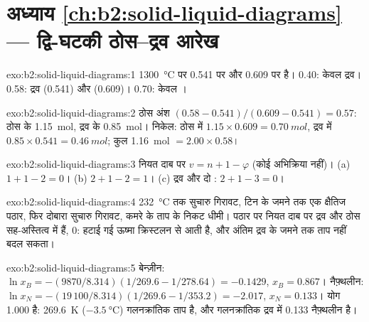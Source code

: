 \section*{अध्याय \ref{ch:b2:solid-liquid-diagrams} --- द्वि-घटकी ठोस--द्रव आरेख}

\begin{solution}{exo:b2:solid-liquid-diagrams:1}
\qty{1300}{\degreeCelsius} पर  0.541 पर और  0.609 पर है।
0.40: केवल द्रव। 0.58: द्रव (0.541) और  (0.609)। 0.70:
केवल ।
\end{solution}

\begin{solution}{exo:b2:solid-liquid-diagrams:2}
ठोस अंश $(0.58 - 0.541)/(0.609 - 0.541) = 0.57$: ठोस के \qty{1.15}{mol},
द्रव के \qty{0.85}{mol}। निकेल: ठोस में $1.15 \times 0.609 = \qty{0.70}{mol}$,
द्रव में $0.85 \times 0.541 = \qty{0.46}{mol}$; कुल \qty{1.16}{mol}
$= 2.00 \times 0.58$।
\end{solution}

\begin{solution}{exo:b2:solid-liquid-diagrams:3}
नियत दाब पर $v = n + 1 - \varphi$ (कोई अभिक्रिया नहीं)। (a) $1 + 1 - 2 = 0$।
(b) $2 + 1 - 2 = 1$। (c) द्रव और दो : $2 + 1 - 3 = 0$।
\end{solution}

\begin{solution}{exo:b2:solid-liquid-diagrams:4}
\qty{232}{\degreeCelsius} तक सुचारु गिरावट, टिन के जमने तक एक क्षैतिज पठार,
फिर दोबारा सुचारु गिरावट, कमरे के ताप के निकट धीमी। पठार पर
नियत दाब पर द्रव और ठोस सह-अस्तित्व में हैं,  0: हटाई गई ऊष्मा
क्रिस्टलन से आती है, और अंतिम द्रव के जमने तक ताप नहीं बदल
सकता।
\end{solution}

\begin{solution}{exo:b2:solid-liquid-diagrams:5}
बेन्ज़ीन: $\ln x_B = -(9870/8.314)(1/269.6 - 1/278.64) = -0.1429$, $x_B =
0.867$। नैफ़्थलीन: $\ln x_N = -(19\,100/8.314)(1/269.6 - 1/353.2) = -2.017$,
$x_N = 0.133$। योग 1.000 है: \qty{269.6}{K} ($\qty{-3.5}{\degreeCelsius}$)
गलनक्रांतिक ताप है, और गलनक्रांतिक द्रव में 0.133 नैफ़्थलीन है।
\end{solution}

